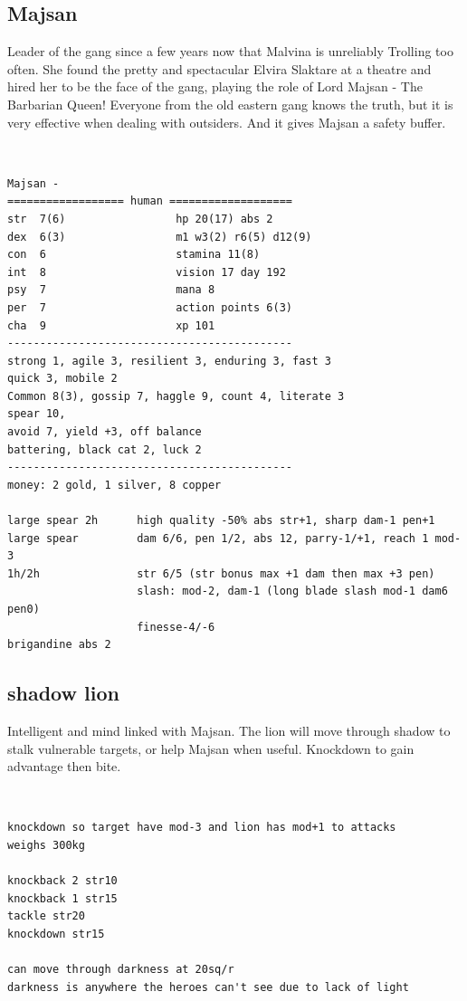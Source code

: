 \clearpage
\begin{samepage}
\subsection*{Majsan}
Leader of the gang since a few years now that Malvina is unreliably Trolling too often. She found the pretty and spectacular Elvira Slaktare at a theatre and hired her to be the face of the gang, playing the role of Lord Majsan - The Barbarian Queen!
Everyone from the old eastern gang knows the truth, but it is very effective when dealing with outsiders. And it gives Majsan a safety buffer.

\

\small \begin{verbatim}
Majsan -
================== human ===================
str  7(6)                 hp 20(17) abs 2
dex  6(3)                 m1 w3(2) r6(5) d12(9)
con  6                    stamina 11(8)
int  8                    vision 17 day 192
psy  7                    mana 8
per  7                    action points 6(3)
cha  9                    xp 101
--------------------------------------------
strong 1, agile 3, resilient 3, enduring 3, fast 3
quick 3, mobile 2
Common 8(3), gossip 7, haggle 9, count 4, literate 3
spear 10,
avoid 7, yield +3, off balance
battering, black cat 2, luck 2
--------------------------------------------
money: 2 gold, 1 silver, 8 copper

large spear 2h      high quality -50% abs str+1, sharp dam-1 pen+1
large spear         dam 6/6, pen 1/2, abs 12, parry-1/+1, reach 1 mod-3
1h/2h               str 6/5 (str bonus max +1 dam then max +3 pen)
                    slash: mod-2, dam-1 (long blade slash mod-1 dam6 pen0)
                    finesse-4/-6
brigandine abs 2
\end{verbatim} \normalsize
\end{samepage}


\begin{samepage}
\subsection*{shadow lion}
Intelligent and mind linked with Majsan. The lion will move through shadow to stalk vulnerable targets, or help Majsan when useful. Knockdown to gain advantage then bite.

\

\small \begin{verbatim}
knockdown so target have mod-3 and lion has mod+1 to attacks
weighs 300kg

knockback 2 str10
knockback 1 str15
tackle str20
knockdown str15

can move through darkness at 20sq/r
darkness is anywhere the heroes can't see due to lack of light
\end{verbatim} \normalsize
\end{samepage}








